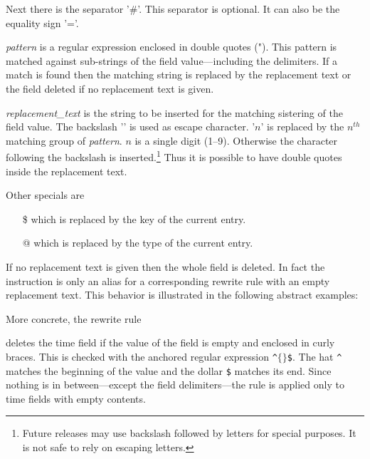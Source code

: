 \documentclass[11pt,a4paper]{scrbook}
\begin{document}
\begin{Resources}
\end{Resources}

Next there is the separator '\#'. This separator is optional. It can also be
the equality sign '='.

\emph{pattern} is a regular expression enclosed in double quotes ("). This
pattern is matched against sub-strings of the field value---including the
delimiters. If a match is found then the matching string is replaced by the
replacement text or the field deleted if no replacement text is given.

\emph{replacement\_text} is the string to be inserted for the matching
sistering of the field value. The backslash '\BS' is used as escape character.
'\BS\(n\)' is replaced by the \(n^{th}\)\/ matching group of \emph{pattern}.
\(n\)\/ is a single digit (1--9). Otherwise the character following the
backslash is inserted.\footnote{Future releases may use backslash followed by
  letters for special purposes. It is not safe to rely on escaping letters.}
Thus it is possible to have double quotes inside the replacement text.

Other specials are
\begin{itemize}
\item [\BS\$] which is replaced by the key of the current entry.
\item [\BS @] which is replaced by the type of the current entry.
\end{itemize}

If no replacement text is given then the whole field is deleted. In fact the
instruction  is only an alias for a corresponding rewrite
rule with an empty replacement text.  This behavior is illustrated in the
following abstract examples:

\begin{Resources}
\end{Resources}

More concrete, the rewrite rule

\begin{Resources}
\end{Resources}

deletes the time field if the value of the field is empty and enclosed in
curly braces. This is checked with the anchored regular expression
\texttt{\^{}\(\{\}\)\$}. The hat \verb|^| matches the beginning of the value
and the dollar \texttt{\$} matches its end. Since nothing is in
between---except the field delimiters---the rule is applied only to time
fields with empty contents.
\end{document}
